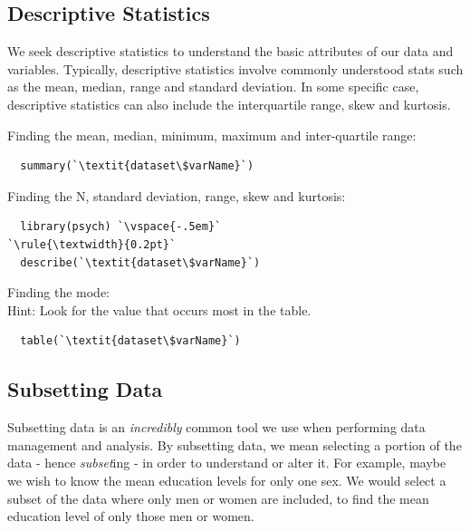 \documentclass[12pt,letterpaper]{article}
\newcommand{\ind}{\phantom{AA}}
\begin{document}
\vspace{1em}

\subsection{Descriptive Statistics}

We seek descriptive statistics to understand the basic attributes of our data and variables. Typically, descriptive statistics involve commonly understood stats such as the mean, median, range and standard deviation. In some specific case, descriptive statistics can also include the interquartile range, skew and kurtosis.

\normalsize
\begin{tcolorbox}[title = Descriptive Statistics]
Finding the mean, median, minimum, maximum and inter-quartile range:
\begin{lstlisting}
  summary(`\textit{dataset\$varName}`)
\end{lstlisting}
Finding the N, standard deviation, range, skew and kurtosis:
\begin{lstlisting}
  library(psych) `\vspace{-.5em}`
`\rule{\textwidth}{0.2pt}`
  describe(`\textit{dataset\$varName}`)
\end{lstlisting}
Finding the mode:\\
\ind Hint: Look for the value that occurs most in the table.
\begin{lstlisting}
  table(`\textit{dataset\$varName}`)
\end{lstlisting}

\end{tcolorbox}

\subsection{Subsetting Data}

Subsetting data is an \textit{incredibly} common tool we use when performing data management and analysis. By subsetting data, we mean selecting a portion of the data - hence \textit{subset}ing - in order to understand or alter it. For example, maybe we wish to know the mean education levels for only one sex. We would select a subset of the data where only men or women are included, to find the mean education level of only those men or women.
\end{document}
